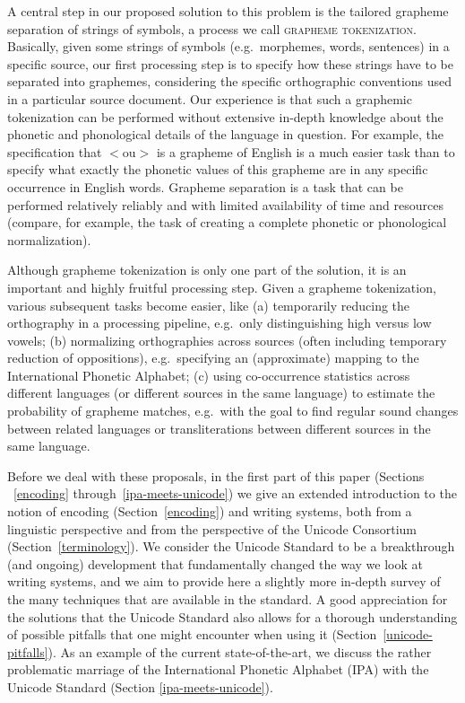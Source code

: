 A central step in our proposed solution to this problem is the tailored grapheme
separation of strings of symbols, a process we call \textsc{grapheme
tokenization}. Basically, given some strings of symbols (e.g.~morphemes, words,
sentences) in a specific source, our first processing step is to specify how
these strings have to be separated into graphemes, considering the specific
orthographic conventions used in a particular source document. Our experience is
that such a graphemic tokenization can be performed without extensive in-depth
knowledge about the phonetic and phonological details of the language in
question. For example, the specification that $<$ou$>$ is a grapheme of English
is a much easier task than to specify what exactly the phonetic values of this
grapheme are in any specific occurrence in English words. Grapheme separation is
a task that can be performed relatively reliably and with limited availability
of time and resources (compare, for example, the task of creating a complete
phonetic or phonological normalization).

Although grapheme tokenization is only one part of the solution, it is an
important and highly fruitful processing step. Given a grapheme tokenization,
various subsequent tasks become easier, like (a) temporarily reducing the
orthography in a processing pipeline, e.g.~only distinguishing high versus low
vowels; (b) normalizing orthographies across sources (often including temporary
reduction of oppositions), e.g.~specifying an (approximate) mapping to the
International Phonetic Alphabet; (c) using co-occurrence statistics across
different languages (or different sources in the same language) to estimate the
probability of grapheme matches, e.g.~with the goal to find regular sound
changes between related languages or transliterations between different sources
in the same language.

Before we deal with these proposals, in the first part of this paper (Sections
~\ref{encoding} through~\ref{ipa-meets-unicode}) we give an extended introduction
to the notion of encoding (Section~\ref{encoding}) and writing systems, both
from a linguistic perspective and from the perspective of the Unicode Consortium
(Section~\ref{terminology}). We consider the Unicode Standard to be a
breakthrough (and ongoing) development that fundamentally changed the way we
look at writing systems, and we aim to provide here a slightly more in-depth
survey of the many techniques that are available in the standard. A good
appreciation for the solutions that the Unicode Standard also allows for a
thorough understanding of possible pitfalls that one might encounter when using
it (Section~\ref{unicode-pitfalls}). As an example of the current
state-of-the-art, we discuss the rather problematic marriage of the
International Phonetic Alphabet (IPA) with the Unicode Standard (Section
\ref{ipa-meets-unicode}).

